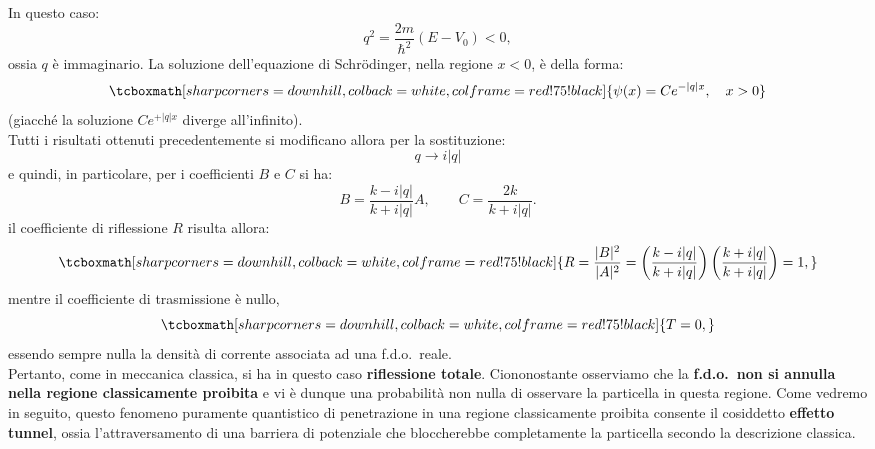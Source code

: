 In questo caso:
	\begin{equation}
		q^2=\frac{2m}{\hbar ^2}\left( E- V_0 \right)<0,
	\end{equation}
ossia $q$ è immaginario. La soluzione dell'equazione di Schr\"{o}dinger, nella regione $x<0$, è della forma:
	\begin{equation}
		\tcboxmath[sharp corners=downhill, colback=white, colframe=red!75!black]{	
			\psi (x) = Ce^{-|q|x}, \quad x>0
			}
	\end{equation}
(giacché la soluzione $\displaystyle{Ce^{+|q|x}}$ diverge all'infinito).\\
Tutti i risultati ottenuti precedentemente si modificano allora per la sostituzione:
	\begin{equation}
		q \rightarrow i|q|
	\end{equation}
e quindi, in particolare, per i coefficienti $B$ e $C$ si ha:
	\begin{equation}
		B=\frac{k-i|q|}{k+i|q|}A, \qquad C=\frac{2k}{k+i|q|}.
	\end{equation}
il coefficiente di riflessione $R$ risulta allora:
	\begin{equation}
		\tcboxmath[sharp corners=downhill, colback=white, colframe=red!75!black]{	
			R=\frac{|B|^2}{|A|^2}=\left(\frac{k-i|q|}{k+i|q|}\right)\left(\frac{k+i|q|}{k+i|q|}\right)=1,
			}
	\end{equation}
mentre il coefficiente di trasmissione è nullo,
	\begin{equation}
		\tcboxmath[sharp corners=downhill, colback=white, colframe=red!75!black]{			
			T=0,
			}
	\end{equation}
essendo sempre nulla la densità di corrente associata ad una f.d.o.~reale.\\

Pertanto, come in meccanica classica, si ha in questo caso \textbf{riflessione totale}. Ciononostante osserviamo che la \textbf{f.d.o.~non si annulla nella regione classicamente proibita} e vi è dunque una probabilità non nulla di osservare la particella in questa regione. Come vedremo in seguito, questo fenomeno puramente quantistico di penetrazione in una regione classicamente proibita consente il cosiddetto \textbf{effetto tunnel}, ossia l'attraversamento di una barriera di potenziale che bloccherebbe completamente la particella secondo la descrizione classica.
